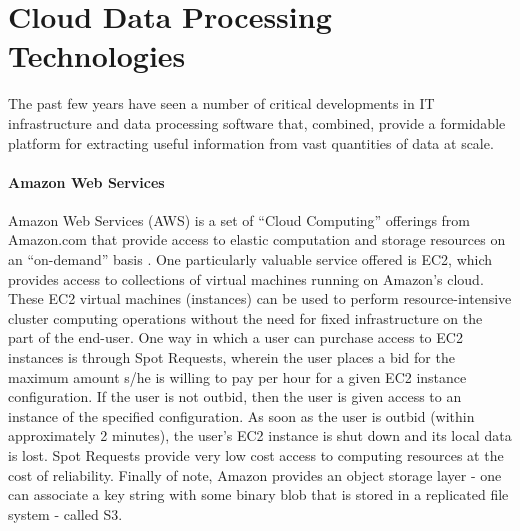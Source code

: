 \documentclass{thesis}
\begin{document}
    \section{Cloud Data Processing Technologies}
        The past few years have seen a number of critical developments in IT
        infrastructure and data processing software that, combined, provide
        a formidable platform for extracting useful information from vast
        quantities of data at scale. %
        \paragraph{Amazon Web Services}%
            Amazon Web Services (AWS) is a set of ``Cloud Computing'' offerings
            from Amazon.com that provide access to elastic computation and storage
            resources on an ``on-demand'' basis \cite{aws}. One particularly valuable
            service offered is EC2, which provides access to collections of virtual
            machines running on Amazon's cloud. These EC2 virtual machines (instances)
            can be used to perform resource-intensive cluster computing operations without
            the need for fixed infrastructure on the part of the end-user. One way in which
            a user can purchase access to EC2 instances is through Spot Requests, wherein the
            user places a bid for the maximum amount s/he is willing to pay per hour for a given
            EC2 instance configuration. If the user is not outbid, then the user is given access
            to an instance of the specified configuration. As soon as the user is outbid (within
            approximately 2 minutes), the user's EC2 instance is shut down and its local data is
            lost. Spot Requests provide very low cost access to computing resources at the cost of
            reliability.%
            Finally of note, Amazon provides an object storage layer - one can associate a key string
            with some binary blob that is stored in a replicated file system - called S3.
\end{document}
